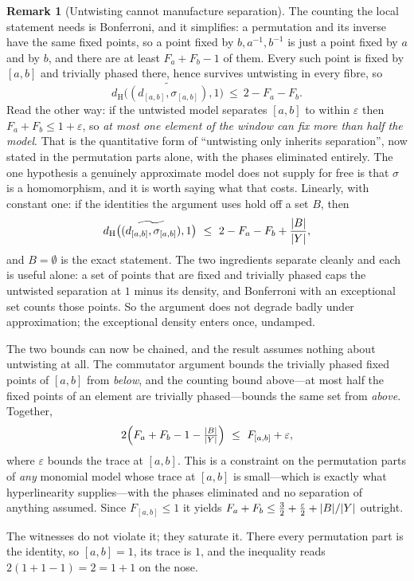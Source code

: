 \documentclass[11pt]{amsart}
\theoremstyle{definition}
\newtheorem{remark}[theorem]{Remark}
\theoremstyle{plain}
\newcommand{\eps}{\varepsilon}
\newcommand{\distH}{d_{\mathrm H}}
\DeclarePairedDelimiter{\abs}{\lvert}{\rvert}
\begin{document}
\begin{remark}[Untwisting cannot manufacture separation]
The counting the local statement needs is Bonferroni, and it simplifies: a permutation and its inverse have the same fixed points, so a point fixed by \(b,a^{-1},b^{-1}\) is just a point fixed by \(a\) and by \(b\), and there are at least \(F_a+F_b-1\) of them.  Every such point is fixed by \([a,b]\) and trivially phased there, hence survives untwisting in every fibre, so
\[
 \distH\bigl(\widetilde{(d_{[a,b]},\sigma_{[a,b]})},1\bigr)\ \leq\ 2-F_a-F_b .
\]
Read the other way: if the untwisted model separates \([a,b]\) to within \(\eps\) then \(F_a+F_b\leq1+\eps\), so \emph{at most one element of the window can fix more than half the model}.  That is the quantitative form of ``untwisting only inherits separation'', now stated in the permutation parts alone, with the phases eliminated entirely.  The one hypothesis a genuinely approximate model does not supply for free is that \(\sigma\) is a homomorphism, and it is worth saying what that costs.  Linearly, with constant one: if the identities the argument uses hold off a set \(B\), then
\[
 \distH\bigl(\widetilde{(d_{[a,b]},\sigma_{[a,b]})},1\bigr)\ \leq\ 2-F_a-F_b+\frac{\abs B}{\abs Y},
\]
and \(B=\emptyset\) is the exact statement.  The two ingredients separate cleanly and each is useful alone: a set of points that are fixed and trivially phased caps the untwisted separation at \(1\) minus its density, and Bonferroni with an exceptional set counts those points.  So the argument does not degrade badly under approximation; the exceptional density enters once, undamped.

The two bounds can now be chained, and the result assumes nothing about untwisting at all.  The commutator argument bounds the trivially phased fixed points of \([a,b]\) from \emph{below}, and the counting bound above---at most half the fixed points of an element are trivially phased---bounds the same set from \emph{above}.  Together,
\[
 2\Bigl(F_a+F_b-1-\tfrac{\abs B}{\abs Y}\Bigr)\ \leq\ F_{[a,b]}+\eps ,
\]
where \(\eps\) bounds the trace at \([a,b]\).  This is a constraint on the permutation parts of \emph{any} monomial model whose trace at \([a,b]\) is small---which is exactly what hyperlinearity supplies---with the phases eliminated and no separation of anything assumed.  Since \(F_{[a,b]}\leq1\) it yields \(F_a+F_b\leq\tfrac32+\tfrac\eps2+\abs B/\abs Y\) outright.

The witnesses do not violate it; they saturate it.  There every permutation part is the identity, so \([a,b]=1\), its trace is \(1\), and the inequality reads \(2(1+1-1)=2=1+1\) on the nose.


\end{remark}
\end{document}
